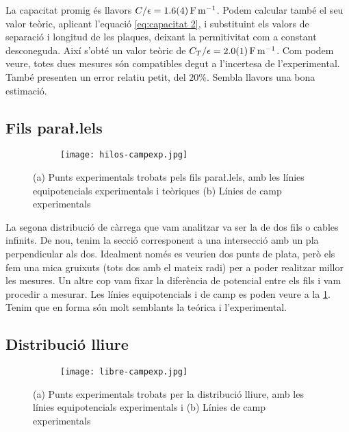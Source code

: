 La capacitat promig és llavors $C/\epsilon = \data{1.6}{0.4}{F.m^{-1}}$. Podem calcular també el seu valor teòric, aplicant l'equació \cref{eq:capacitat 2}, i substituint els valors de separació i longitud de les plaques, deixant la permitivitat com a constant desconeguda.
Així s'obté un valor teòric de $C_T/\epsilon = \data{2.0}{0.1}{F.m^{-1}} $. Com podem veure, totes dues mesures són compatibles degut a l'incertesa de l'experimental. També presenten un error relatiu petit, del $20\%$. Sembla llavors una bona estimació.

\subsection{Fils para\l.lels}
\begin{figure}[htb]
  \centering \small \sffamily
	\begin{subfigure}[b]{\textwidth}
		\centering
  	
		\caption{}
	\end{subfigure}

  \begin{subfigure}[b]{\textwidth}
		\centering
		\texttt{[image: hilos-campexp.jpg]}
		\caption{}
	\end{subfigure}
  \caption{(a) Punts experimentals trobats pels fils para\l.lels, amb les línies equipotencials experimentals i teòriques
  (b) Línies de camp experimentals}
  \label{fig:camp fils}
\end{figure}

La segona distribució de càrrega que vam analitzar va ser la de dos fils o cables infinits. De nou, tenim la secció corresponent a una intersecció amb un pla perpendicular als dos. Idealment només es veurien dos punts de plata, però els fem una mica gruixuts (tots dos amb el mateix radi) per a poder realitzar millor les mesures. Un altre cop vam fixar la diferència de potencial entre els fils i vam procedir a mesurar. Les línies equipotencials i de camp es poden veure a la \cref{fig:camp fils}. Tenim que en forma són molt semblants la teórica i l'experimental.

\subsection{Distribució lliure}
\begin{figure}[htb]
  \centering \small \sffamily
	\begin{subfigure}[b]{\textwidth}
		\centering
  	
		\caption{}
	\end{subfigure}

  \begin{subfigure}[b]{\textwidth}
		\centering
		\texttt{[image: libre-campexp.jpg]}
		\caption{}
	\end{subfigure}
  \caption{(a) Punts experimentals trobats per la distribució lliure, amb les línies equipotencials experimentals i 
  (b) Línies de camp experimentals}
  \label{fig:camp lliure}
\end{figure}

